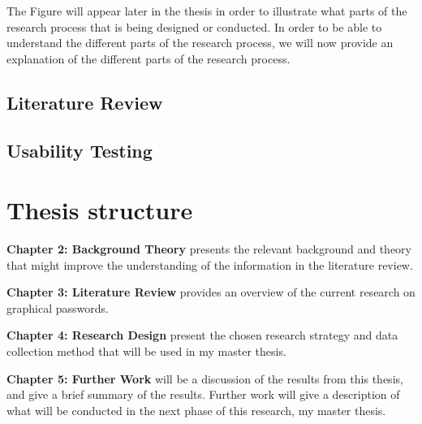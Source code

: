     The Figure will appear later in the thesis in order to illustrate what parts of the research process that is being designed or conducted. In order to be able to understand the different parts of the research process, we will now provide an explanation of the different parts of the research process. 


    \subsection{Literature Review}

    \subsection{Usability Testing}

  \section{Thesis structure}

    {\bf Chapter 2: Background Theory} presents the relevant background and theory that might improve the understanding of the information in the literature review. 

    {\bf Chapter 3: Literature Review} provides an overview of the current research on graphical passwords. 

    {\bf Chapter 4: Research Design} present the chosen research strategy and data collection method that will be used in my master thesis. 

    {\bf Chapter 5: Further Work} will be a discussion of the results from this thesis, and give a brief summary of the results. Further work will give a description of what will be conducted in the next phase of this research, my master thesis.  





